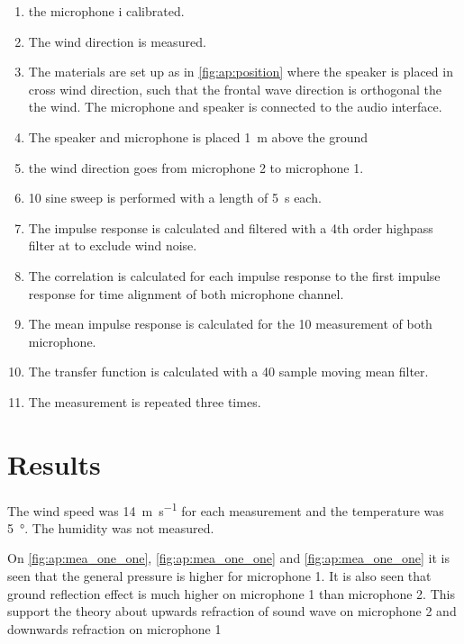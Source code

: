 \begin{enumerate}
\item the microphone i calibrated.
\item The wind direction is measured.
\item The materials are set up as in \autoref{fig:ap:position} where the speaker is placed in cross wind direction, such that the frontal wave direction is orthogonal the the wind. The microphone and speaker is connected to the audio interface.
\item The speaker and microphone is placed \SI{1}{\meter} above the ground
\item the wind direction goes from microphone 2 to microphone 1.
\item 10 sine sweep is performed with a length of \SI{5}{\second} each. 
\item The impulse response is calculated and filtered with a 4th order highpass filter at  to exclude wind noise.
\item The correlation is calculated for each impulse response to the first impulse response for time alignment \citep{gunness2001loudspeaker} of both microphone channel.
\item The mean impulse response is calculated for the 10 measurement of both microphone.
\item The transfer function is calculated with a 40 sample moving mean filter.
\item The measurement is repeated three times.
\end{enumerate}


\section*{Results}

The wind speed was \SI{14}{\meter\per\second} for each measurement and the temperature was \SI{5}{\degree}. The humidity was not measured. 


On \autoref{fig:ap:mea_one_one}, \autoref{fig:ap:mea_one_one} and \autoref{fig:ap:mea_one_one} it is seen that the general pressure is higher for microphone 1. It is also seen that ground reflection effect is much higher on microphone 1 than microphone 2. This support the theory about upwards refraction of sound wave on microphone 2 and downwards refraction on microphone 1 



